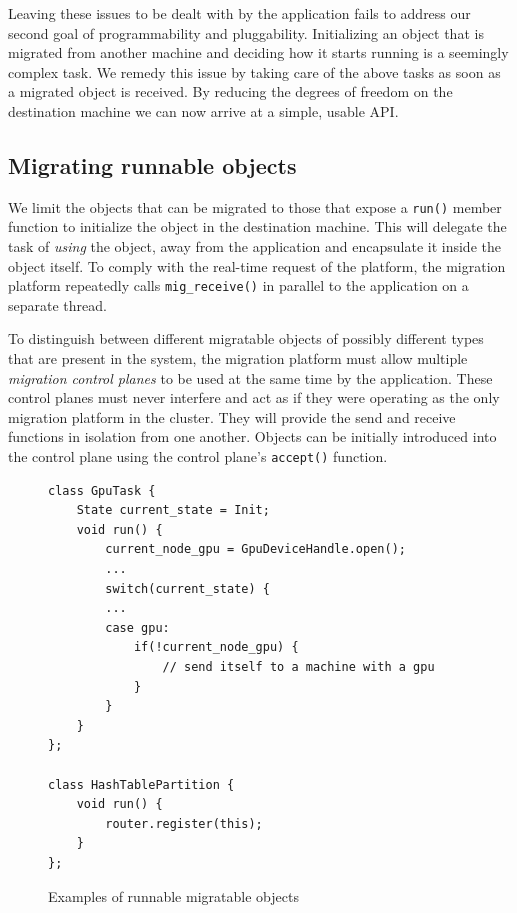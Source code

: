 Leaving these issues to be dealt with by the application
fails to address our second goal of programmability and pluggability.
Initializing an object that is migrated from another machine and deciding how
it starts running is a seemingly complex task.
We remedy this issue by taking care of the above tasks as soon as a migrated
object is received. By reducing the degrees of freedom on the destination
machine we can now arrive at a simple, usable API.

\subsection{Migrating runnable objects}
\label{subsec:runnable}
We limit the objects that can be migrated to those
that expose a \texttt{run()} member function to
initialize the object in the destination machine. This will delegate the task
of \emph{using} the object, away from the application and encapsulate it inside
the object itself. To comply with the real-time request of the platform,
the migration platform repeatedly calls \texttt{mig\_receive()} in parallel to the
application on a separate thread.

To distinguish between different migratable objects of possibly different
types that are present in the system, the migration platform must allow
multiple
\emph{migration control planes} to be used at the same time by the
application. These control planes must never interfere and act as if they were
operating as the only migration platform in the cluster. They will provide
the send and receive functions in isolation from one another.
Objects can be initially introduced into the control plane
using the control plane's \texttt{accept()} function.

\begin{figure}[tp]
\begin{lstlisting}
class GpuTask {
    State current_state = Init;
    void run() {
        current_node_gpu = GpuDeviceHandle.open();
        ...
        switch(current_state) {
        ...
        case gpu:
            if(!current_node_gpu) {
                // send itself to a machine with a gpu
            }
        }
    }
};

class HashTablePartition {
    void run() {
        router.register(this);
    }
};
\end{lstlisting}
\caption{
    Examples of runnable migratable objects
}
\label{fig:sketchclasses}
\end{figure}

